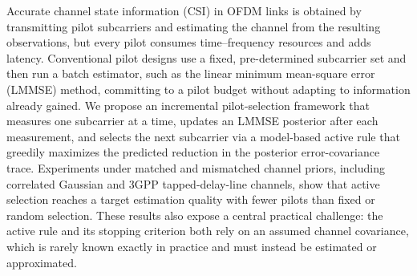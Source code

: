 Accurate channel state information (CSI) in OFDM links is obtained by transmitting pilot subcarriers and estimating the channel from the resulting observations, but every pilot consumes time--frequency resources and adds latency. Conventional pilot designs use a fixed, pre-determined subcarrier set and then run a batch estimator, such as the linear minimum mean-square error (LMMSE) method, committing to a pilot budget without adapting to information already gained. We propose an incremental pilot-selection framework that measures one subcarrier at a time, updates an LMMSE posterior after each measurement, and selects the next subcarrier via a model-based active rule that greedily maximizes the predicted reduction in the posterior error-covariance trace. Experiments under matched and mismatched channel priors, including correlated Gaussian and 3GPP tapped-delay-line channels, show that active selection reaches a target estimation quality with fewer pilots than fixed or random selection. These results also expose a central practical challenge: the active rule and its stopping criterion both rely on an assumed channel covariance, which is rarely known exactly in practice and must instead be estimated or approximated.
